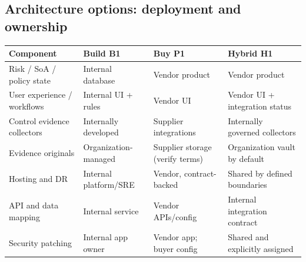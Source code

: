 \documentclass[10pt,letterpaper]{article}
\begin{document}
\subsection{Architecture options: deployment and ownership}

\begin{tabularx}{\linewidth}{@{}L{1.35in}YYY@{}}
\toprule
\textbf{Component} & \textbf{Build B1} & \textbf{Buy P1} & \textbf{Hybrid H1}\\\midrule
Risk / SoA / policy state & Internal database & Vendor product & Vendor product\\
User experience / workflows & Internal UI + rules & Vendor UI & Vendor UI + integration status\\
Control evidence collectors & Internally developed & Supplier integrations & Internally governed collectors\\
Evidence originals & Organization-managed & Supplier storage (verify terms) & Organization vault by default\\
Hosting and DR & Internal platform/SRE & Vendor, contract-backed & Shared by defined boundaries\\
API and data mapping & Internal service & Vendor APIs/config & Internal integration contract\\
Security patching & Internal app owner & Vendor app; buyer config & Shared and explicitly assigned\\
\bottomrule
\end{tabularx}
\end{document}
